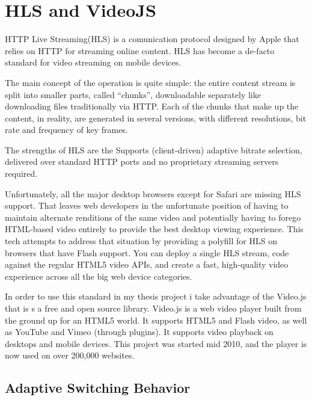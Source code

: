 \section{HLS and VideoJS}
\label{sec:HLS and VideoJS}

HTTP Live Streaming(HLS) is a comunication protocol designed by Apple that relies on HTTP for streaming online content.
HLS has become a de-facto standard for video streaming on mobile devices. 

The main concept of the operation is quite simple: the entire content stream is split into smaller parts, called “chunks”, downloadable separately like downloading files traditionally via HTTP.
Each of the chunks that make up the content, in reality, are generated in several versions, with different resolutions, bit rate and frequency of key frames.

The strengths of HLS are the Supports (client-driven) adaptive bitrate selection, delivered over standard HTTP ports and no proprietary streaming servers required.

Unfortunately, all the major desktop browsers except for Safari are missing HLS support. That leaves web developers in the unfortunate position of having to maintain alternate renditions of the same video and potentially having to forego HTML-based video entirely to provide the best desktop viewing experience.
This tech attempts to address that situation by providing a polyfill for HLS on browsers that have Flash support. You can deploy a single HLS stream, code against the regular HTML5 video APIs, and create a fast, high-quality video experience across all the big web device categories.\cite{videojs_hls}


In order to use this standard in my thesis project i take advantage of the Video.js that is s a free and open source library.
Video.js is a web video player built from the ground up for an HTML5 world. It supports HTML5 and Flash video, as well as YouTube and Vimeo (through plugins). It supports video playback on desktops and mobile devices. This project was started mid 2010, and the player is now used on over 200,000 websites.\cite{videojs}


\subsection{Adaptive Switching Behavior}
\label{sec:Adaptive Switching Behavior}


